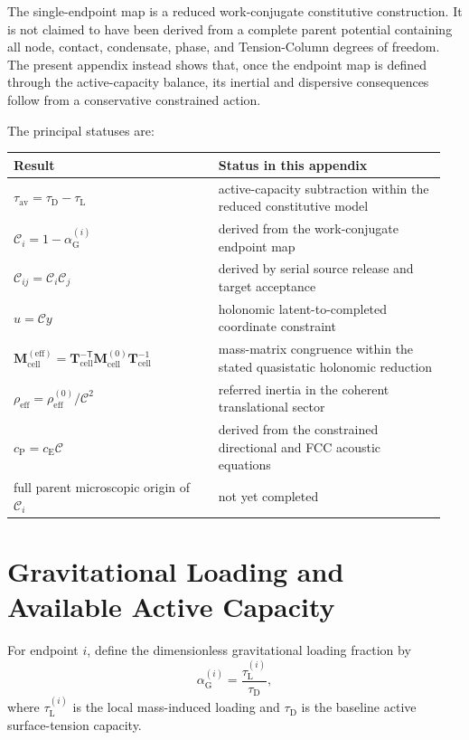 The single-endpoint map is a reduced work-conjugate constitutive construction. It is not claimed to have been derived from a complete parent potential containing all node, contact, condensate, phase, and Tension-Column degrees of freedom. The present appendix instead shows that, once the endpoint map is defined through the active-capacity balance, its inertial and dispersive consequences follow from a conservative constrained action.

The principal statuses are:

\begin{table}[h!]
\centering
\renewcommand{\arraystretch}{1.3}
\begin{tabular}{p{0.45\linewidth} p{0.5\linewidth}}
\hline
\textbf{Result} & \textbf{Status in this appendix} \\
\hline
$\tau_{\mathrm{av}}=\tau_{\mathrm{D}}-\tau_{\mathrm{L}}$ &
active-capacity subtraction within the reduced constitutive model
\\
$\mathcal{C}_{i}=1-\alpha_{\mathrm{G}}^{(i)}$ &
derived from the work-conjugate endpoint map
\\
$\mathcal{C}_{ij}=\mathcal{C}_{i}\mathcal{C}_{j}$ &
derived by serial source release and target acceptance
\\
$u=\mathcal{C}y$ &
holonomic latent-to-completed coordinate constraint
\\
$\mathbf{M}_{\mathrm{cell}}^{(\mathrm{eff})}=\mathbf{T}_{\mathrm{cell}}^{-\mathsf{T}}\mathbf{M}_{\mathrm{cell}}^{(0)}\mathbf{T}_{\mathrm{cell}}^{-1}$ &
mass-matrix congruence within the stated quasistatic holonomic reduction
\\
$\rho_{\mathrm{eff}}=\rho_{\mathrm{eff}}^{(0)}/\mathcal{C}^{2}$ &
referred inertia in the coherent translational sector
\\
$c_{\mathrm{P}}=c_{\mathrm{E}}\mathcal{C}$ &
derived from the constrained directional and FCC acoustic equations
\\
full parent microscopic origin of $\mathcal{C}_{i}$ &
not yet completed
\\
\hline
\end{tabular}
\end{table}

\section{Gravitational Loading and Available Active Capacity}
\label{sec:grav_active_capacity}

For endpoint $i$, define the dimensionless gravitational loading fraction by
\begin{equation}
    \alpha_{\mathrm{G}}^{(i)} = \frac{\tau_{\mathrm{L}}^{(i)}}{\tau_{\mathrm{D}}},
\end{equation}
where $\tau_{\mathrm{L}}^{(i)}$ is the local mass-induced loading and $\tau_{\mathrm{D}}$ is the baseline active surface-tension capacity.

